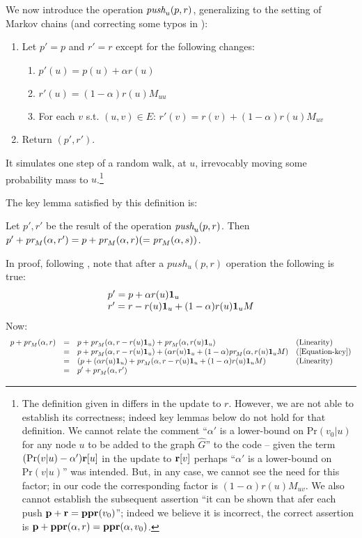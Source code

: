 \documentclass{article} %
\begin{document}
We now introduce the operation $\mbox{\em push}_u(p,r)$, generalizing \cite[Section 3]{Andersen-2006} to the setting of Markov chains (and correcting some typos in \cite[Table 2]{Cohen-2015}): 
\begin{enumerate}
\item Let $p'=p$ and $r'=r$ except for the following changes:
  \begin{enumerate}
  \item $p'(u)=p(u) + \alpha r(u)$
  \item $r'(u) = (1-\alpha)r(u) M_{uu}$
  \item For each $v$ s.t. $(u,v)\in E$: $r'(v)=r(v)+ (1-\alpha)r(u)M_{uv}$
  \end{enumerate}
\item Return $(p',r')$.
\end{enumerate}
\noindent It simulates one step of a random walk, at $u$, irrevocably moving some probability mass to $u$.\footnote{The definition given in \cite[Table 2]{Cohen-2015} differs in the update to $r$. However, we are not able to establish its correctness; indeed key lemmas below do not hold for that definition. We cannot relate the comment ``$\alpha'$ is a lower-bound on $\mbox{Pr}(v_0|u)$ for any node $u$ to be added to the graph $\hat{G}$'' to the code -- given the term $(\mbox{Pr}(v|u)-\alpha'){\bf r}[u]$ in the update to ${\bf r}[v]$ perhaps ``$\alpha'$ is a lower-bound on $\mbox{Pr}(v|u)$'' was intended. But, in any case, we cannot see the need for this factor; in our code the corresponding factor is $(1-\alpha)r(u)M_{uv}$. We also cannot establish the subsequent assertion ``it can be shown that afer each push ${\bf p}+{\bf r} = \mbox{\bf ppr}(v_0)$''; indeed we believe it is incorrect, the correct assertion is ${\bf p}+\mbox{\bf ppr}(\alpha,r) = \mbox{\bf ppr}(\alpha,v_0)$.} 

The key lemma satisfied by this definition is:
\begin{lemma}
Let $p',r'$ be the result of the operation $\mbox{\em push}_u(p,r)$. Then $p'+\mbox{\em pr}_M(\alpha,r')=p+\mbox{\em pr}_M(\alpha,r) (=\mbox{\em pr}_M(\alpha,s))$. 
\end{lemma}
In proof, following \cite[Appendix]{Andersen-2006}, note that after a $push_u(p,r)$ operation the following is true:
\[
\begin{array}{l}
  p' = p + \alpha r(u) {\bf 1}_u\\
  r' = r - r(u) {\bf 1}_u + (1-\alpha)r(u){\bf 1}_uM
\end{array}
\]
Now:
$$
\begin{array}{llll}
 p+\mbox{\em pr}_M(\alpha,r) &=& p+\mbox{\em pr}_M(\alpha, r- r(u){\bf 1}_u) + \mbox{\em pr}_M(\alpha, r(u){\bf 1}_u) & \mbox{(Linearity)}\\
&=& p+\mbox{\em pr}_M(\alpha, r- r(u){\bf 1}_u) + (\alpha r(u){\bf 1}_u + (1-\alpha)\mbox{\em pr}_M(\alpha, r(u){\bf 1}_u M) & \mbox{(\ref{Equation-key})}\\
&=& (p+ (\alpha r(u){\bf 1}_u) + \mbox{\em pr}_M(\alpha, r- r(u){\bf 1}_u + (1-\alpha)r(u){\bf 1}_u M) & \mbox{(Linearity)}\\
&=& p'+\mbox{\em pr}_M(\alpha,r')
\end{array}
$$
\end{document}
